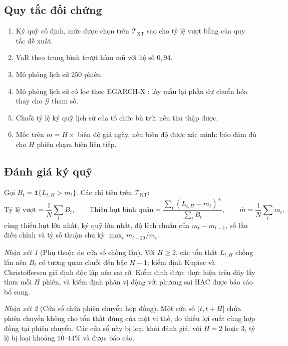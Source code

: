 \documentclass[12pt,a4paper]{article}
\theoremstyle{definition}
\theoremstyle{remark}
\newtheorem{nhanxet}{Nhận xét}[section]
\newcommand{\Gcal}{\mathcal{G}}
\newcommand{\ind}{\mathbf{1}}
\begin{document}
\subsection{Quy tắc đối chứng}

\begin{enumerate}
\item Ký quỹ cố định, mức được chọn trên $\mathcal T_{\mathrm{XT}}$ sao cho tỷ lệ vượt bằng của quy tắc đề xuất.
\item VaR theo trung bình trượt hàm mũ với hệ số $0{,}94$.
\item Mô phỏng lịch sử $250$ phiên.
\item Mô phỏng lịch sử có lọc theo EGARCH-X \cite{mcneilfrey2000}: lấy mẫu lại phần dư chuẩn hóa thay cho $\Gcal$ tham số.
\item Chuỗi tỷ lệ ký quỹ lịch sử của tổ chức bù trừ, nếu thu thập được.
\item Mốc trên $m=H\times$ biên độ giá ngày, nếu biên độ được xác minh: bảo đảm đủ cho $H$ phiên chạm biên liên tiếp.
\end{enumerate}

\subsection{Đánh giá ký quỹ}\label{sec:danhgiakyquy}

Gọi $B_t=\ind\{L_{t,H}>m_t\}$. Các chỉ tiêu trên $\mathcal T_{\mathrm{KT}}$:
\begin{equation}
\text{Tỷ lệ vượt}=\frac1N\sum_tB_t,\qquad
\text{Thiếu hụt bình quân}=\frac{\sum_t(L_{t,H}-m_t)^{+}}{\sum_tB_t},\qquad
\bar m=\frac1N\sum_tm_t,
\end{equation}
cùng thiếu hụt lớn nhất, ký quỹ lớn nhất, độ lệch chuẩn của $m_t-m_{t-1}$, số lần điều chỉnh và tỷ số thuận chu kỳ $\max_t m_{t+20}/m_t$.

\begin{nhanxet}[Phụ thuộc do cửa sổ chồng lấn]
Với $H\ge2$, các tổn thất $L_{t,H}$ chồng lấn nên $B_t$ có tương quan chuỗi đến bậc $H-1$; kiểm định Kupiec và Christoffersen giả định độc lập nên sai cỡ. Kiểm định được thực hiện trên dãy lấy thưa mỗi $H$ phiên, và kiểm định phân vị động với phương sai HAC được báo cáo bổ sung.
\end{nhanxet}

\begin{nhanxet}[Cửa sổ chứa phiên chuyển hợp đồng]
Một cửa sổ $(t,t+H]$ chứa phiên chuyển không cho tổn thất đúng của một vị thế, do thiếu lợi suất cùng hợp đồng tại phiên chuyển. Các cửa sổ này bị loại khỏi đánh giá; với $H=2$ hoặc $3$, tỷ lệ bị loại khoảng $10$--$14\%$ và được báo cáo.
\end{nhanxet}
\end{document}
